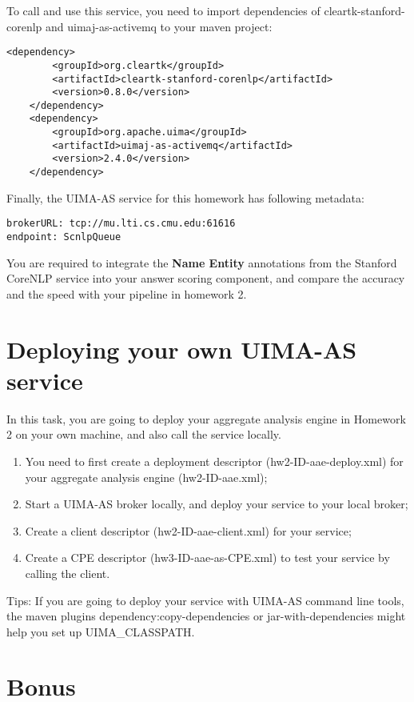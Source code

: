 To call and use this service, you need to import dependencies of 
cleartk-stanford-corenlp and uimaj-as-activemq to your maven project:
\begin{lstlisting}[frame=single, numbers=none]  
	<dependency>
		<groupId>org.cleartk</groupId>
		<artifactId>cleartk-stanford-corenlp</artifactId>
		<version>0.8.0</version>
	</dependency>
	<dependency>
		<groupId>org.apache.uima</groupId>
		<artifactId>uimaj-as-activemq</artifactId>
		<version>2.4.0</version>
	</dependency>
\end{lstlisting}

Finally, the UIMA-AS service for this homework has following metadata:
\begin{lstlisting}[frame=single, numbers=none]  
brokerURL: tcp://mu.lti.cs.cmu.edu:61616
endpoint: ScnlpQueue
\end{lstlisting}

You are required to integrate the \textbf {Name Entity} annotations from the Stanford CoreNLP service into your answer scoring component, 
and compare the accuracy and the speed with your pipeline in homework 2.  


\section{Deploying your own UIMA-AS service}

In this task, you are going to deploy your aggregate analysis engine in Homework 2 on your own machine, 
and also call the service locally.  
\begin{enumerate}
  \item You need to first create a deployment descriptor (hw2-ID-aae-deploy.xml)
for your aggregate analysis engine (hw2-ID-aae.xml);
\item Start a UIMA-AS broker locally, and deploy your service to your local broker;
\item Create a client descriptor (hw2-ID-aae-client.xml) for your service;
\item Create a CPE descriptor (hw3-ID-aae-as-CPE.xml) to test your service by calling the client.  
\end{enumerate}

Tips: If you are going to deploy your service with UIMA-AS command line tools, 
the maven plugins dependency:copy-dependencies or jar-with-dependencies might help you set up UIMA\_CLASSPATH.

\section{Bonus}


